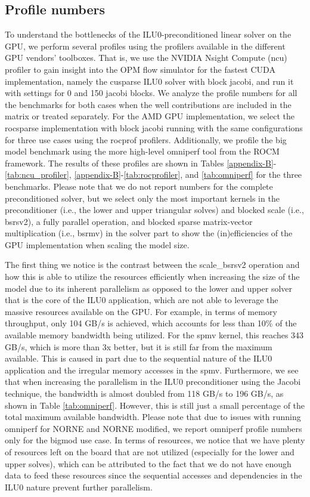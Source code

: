 \subsection{Profile numbers}

To understand the bottlenecks of the ILU0-preconditioned linear solver on the GPU, we perform several profiles using the profilers available in the different GPU vendors' toolboxes. That is, we use the NVIDIA Nsight Compute (ncu) profiler to gain insight into the OPM flow simulator for the fastest CUDA implementation, namely the cusparse ILU0 solver with block jacobi, and run it with settings for 0 and 150 jacobi blocks. We analyze the profile numbers for all the benchmarks for both cases when the well contributions are included in the matrix or treated separately. For the AMD GPU implementation, we select the rocsparse implementation with block jacobi running with the same configurations for three use cases using the rocprof profilers. Additionally, we profile the big model benchmark using the more high-level omniperf tool from the ROCM framework. The results of these profiles are shown in Tables \ref{appendix-B}-\ref{tab:ncu_profiler}, \ref{appendix-B}-\ref{tab:rocprofiler}, and \ref{tab:omniperf} for the three benchmarks. Please note that we do not report numbers for the complete preconditioned solver, but we select only the most important kernels in the preconditioner (i.e., the lower and upper triangular solves) and blocked scale (i.e., bsrsv2), a fully parallel operation, and blocked sparse matrix-vector multiplication (i.e., bsrmv) in the solver part to show the (in)efficiencies of the GPU implementation when scaling the model size.

The first thing we notice is the contrast between the scale\_bsrsv2 operation and how this is able to utilize the resources efficiently when increasing the size of the model due to its inherent parallelism as opposed to the lower and upper solver that is the core of the ILU0 application, which are not able to leverage the massive resources available on the GPU. For example, in terms of memory throughput, only 104 GB/s is achieved, which accounts for less than 10\% of the available memory bandwidth being utilized. For the spmv kernel, this reaches 343 GB/s, which is more than 3x better, but it is still far from the maximum available. This is caused in part due to the sequential nature of the ILU0 application and the irregular memory accesses in the spmv. Furthermore, we see that when increasing the parallelism in the ILU0 preconditioner using the Jacobi technique, the bandwidth is almost doubled from 118 GB/s to 196 GB/s, as shown in Table \ref{tab:omniperf}. However, this is still just a small percentage of the total maximum available bandwidth. Please note that due to issues with running omniperf for NORNE and NORNE modified, we report omniperf profile numbers only for the bigmod use case. In terms of resources, we notice that we have plenty of resources left on the board that are not utilized (especially for the lower and upper solves), which can be attributed to the fact that we do not have enough data to feed these resources since the sequential accesses and dependencies in the ILU0 nature prevent further parallelism.  

